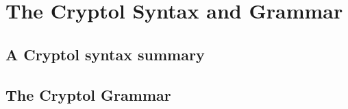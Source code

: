 \chapter{The Cryptol Syntax and Grammar}
\label{cha:crypt-synt-gramm}


\section{A Cryptol syntax summary}
\label{sec:crypt-synt-summ}

\section{The Cryptol Grammar}
\label{sec:cryptol-grammar}

